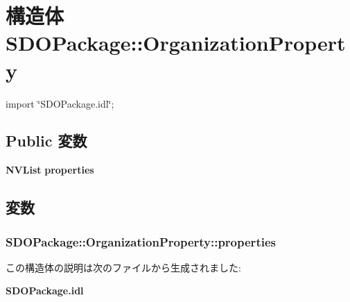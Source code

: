 \section{構造体 SDOPackage::OrganizationProperty}
\label{structSDOPackage_1_1OrganizationProperty}


{\ttfamily import \char`\"{}SDOPackage.idl\char`\"{};}

\subsection*{Public 変数}
\begin{DoxyCompactItemize}
\item 
{\bf NVList} {\bf properties}
\end{DoxyCompactItemize}


\subsection{変数}
\subsubsection[{properties}]{ {\bf SDOPackage::OrganizationProperty::properties}}\label{structSDOPackage_1_1OrganizationProperty_a7ffebfa961644064d0051782634c2554}


この構造体の説明は次のファイルから生成されました:\begin{DoxyCompactItemize}
\item 
{\bf SDOPackage.idl}\end{DoxyCompactItemize}
